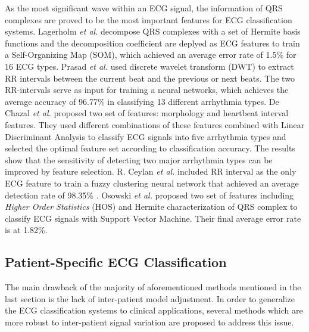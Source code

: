 As the most significant wave within an ECG signal, the information of QRS complexes are proved to be the most important features for ECG classification systems. Lagerholm \textit{et al.} decompose QRS complexes with a set of Hermite basis functions and the decomposition coefficient are deplyed as ECG features to train a Self-Organizing Map (SOM), which achieved an average error rate of 1.5\% for 16 ECG types\cite{lagerholm2000clustering}. Prasad \textit{et al.} used discrete wavelet transform (DWT) to extract RR intervals between the current beat and the previous or next beats. The two RR-intervals serve as input for training a neural networks, which achieves the average accuracy of 96.77\% in classifying 13 different arrhythmia types. De Chazal \textit{et al.} proposed two set of features: morphology and heartbeat interval features. They used different combinations of these features combined with Linear Discriminant Analysis to classify ECG signals into five arrhythmia types and selected the optimal feature set according to classification accuracy\cite{autofs}. The results show that the sensitivity of detecting two major arrhythmia types can be improved by feature selection. R. Ceylan \textit{et al.} included RR interval as the only ECG feature to train a fuzzy clustering neural network that achieved an average detection rate of 98.35\%\cite{ceylan2009novel} . Osowski \textit{et al.} proposed two set of features including \textit{Higher Order Statistics} (HOS) and Hermite characterization of QRS complex to classify ECG signals with Support Vector Machine. Their final average error rate is at 1.82\%\cite{osowski2004support}. %

\subsection{Patient-Specific ECG Classification}

The main drawback of the majority of aforementioned methods mentioned in the last section is the lack of inter-patient model adjustment. In order to generalize the ECG classification systems to clinical applications, several methods which are more robust to inter-patient signal variation are proposed to address this issue\cite{Hu_et_al,deChazal2006,llamedo2012automatic,bbnn,ince2009generic,Kiranyaz}.

